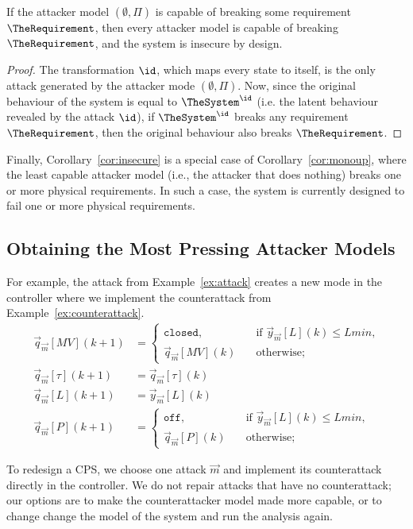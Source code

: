 {\begin{corollary}
  \label{cor:insecure}
  If the attacker model $(\emptyset,\Pi)$ is capable of breaking some requirement $\TheRequirement$, then every attacker model is capable of breaking $\TheRequirement$, and the system is insecure by design.
\end{corollary}
\begin{proof}
  The transformation $\id$, which maps every state to itself, is the only attack generated by the attacker mode $(\emptyset,\Pi)$. Now, since the original behaviour of the system is equal to $\TheSystem^{\id}$ (i.e. the latent behaviour revealed by the attack $\id$), if $\TheSystem^{\id}$ breaks any requirement $\TheRequirement$, then the original behaviour also breaks $\TheRequirement$.
\end{proof}
Finally, Corollary~\ref{cor:insecure} is a special case of Corollary~\ref{cor:monoup}, where the least capable attacker model (i.e., the attacker that does nothing) breaks one or more physical requirements. In such a case, the system is currently designed to fail one or more physical requirements. 
\subsection{Obtaining the Most Pressing Attacker Models}
\begin{example}
  For example, the attack from Example~\ref{ex:attack} creates a new mode in the controller where we implement the counterattack from Example~\ref{ex:counterattack}.
\begin{align}
  \label{eq:ControllerStager3}
  \vec{q}_{\vec{m}}[MV](k+1)&=
  \begin{cases}
    \texttt{closed},&\quad \text{if $\vec{y}_{\vec{m}}[L](k)\leq Lmin$,}\\
    \vec{q}_{\vec{m}}[MV](k)&\quad \text{otherwise;}    
  \end{cases}\\
  \vec{q}_{\vec{m}}[\tau](k+1)&=\vec{q}_{\vec{m}}[\tau](k)\\
\vec{q}_{\vec{m}}[L](k+1)&=\vec{y}_{\vec{m}}[L](k)\\
\vec{q}_{\vec{m}}[P](k+1)&=\begin{cases}
  \texttt{off},&\quad \text{if $\vec{y}_{\vec{m}}[L](k)\leq Lmin$,}\\
  \vec{q}_{\vec{m}}[P](k)&\quad \text{otherwise;}    
\end{cases}
\end{align}
\end{example}
To redesign a CPS, we choose one attack $\vec{m}$ and implement its counterattack directly in the controller. We do not repair attacks that have no counterattack; our options are to make the counterattacker model made more capable, or to change change the model of the system and run the analysis again.

}
